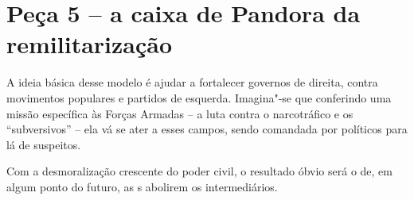 \section{Peça 5 -- a caixa de Pandora da remilitarização}

A ideia básica desse modelo é ajudar a fortalecer governos de direita,
contra movimentos populares e partidos de esquerda. Imagina"-se que
conferindo uma missão específica às Forças Armadas -- a luta contra o
narcotráfico e os ``subversivos'' -- ela vá se ater a esses campos,
sendo comandada por políticos para lá de suspeitos.

Com a desmoralização crescente do poder civil, o resultado óbvio será o
de, em algum ponto do futuro, as s abolirem os intermediários.
